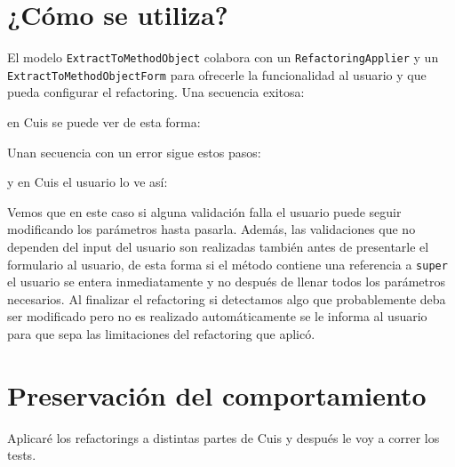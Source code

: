 \section{¿Cómo se utiliza?}

El modelo \lstinline{ExtractToMethodObject} colabora con un
\lstinline{RefactoringApplier} y un \lstinline{ExtractToMethodObjectForm} para
ofrecerle la funcionalidad al usuario y que pueda configurar el refactoring. Una
secuencia exitosa:

en Cuis se puede ver de esta forma:


Unan secuencia con un error sigue estos pasos:


y en Cuis el usuario lo ve así:


Vemos que en este caso si alguna validación falla el usuario puede seguir
modificando los parámetros hasta pasarla. Además, las validaciones que no
dependen del input del usuario son realizadas también antes de presentarle el
formulario al usuario, de esta forma si el método contiene una referencia a
\lstinline{super} el usuario se entera inmediatamente y no después de llenar
todos los parámetros necesarios. Al finalizar el refactoring si detectamos algo
que probablemente deba ser modificado pero no es realizado automáticamente se le
informa al usuario para que sepa las limitaciones del refactoring que aplicó.


\section{Preservación del comportamiento}
Aplicaré los refactorings a distintas partes de Cuis y después le voy a correr
los tests.

